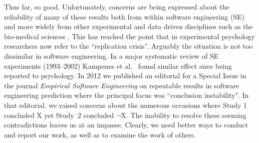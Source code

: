 \documentclass[preprint,10pt]{elsarticle}
\begin{document}
Thus far, so good.  Unfortunately, concerns are being expressed about the reliability of many of these results both from within software engineering (SE) \cite{Shep14,Jorg16} and more widely from other experimental and data driven disciplines such as the bio-medical sciences \cite{Ioan05,Earp15}.  This has reached the point that in experimental psychology researchers now refer to the ``replication crisis''. Arguably the situation is not too dissimilar in software engineering.  In a major systematic review of SE experiments (1993--2002) Kampenes et al.~\cite{Kamp07} found similar effect sizes being reported to psychology. In 2012 we published an editorial for a Special Issue in the journal \textit{Empirical Software Engineering} on repeatable results in software engineering prediction \cite{menzies12} where the principal focus was ``conclusion instability".  In that editorial, we raised concerns about the numerous occasions where Study 1 concluded X yet Study~2 concluded $\neg$X.  The inability to resolve these seeming contradictions leaves us at an impasse.  Clearly, we need better ways to conduct and report our work, as well as to examine the work of others.
\end{document}
